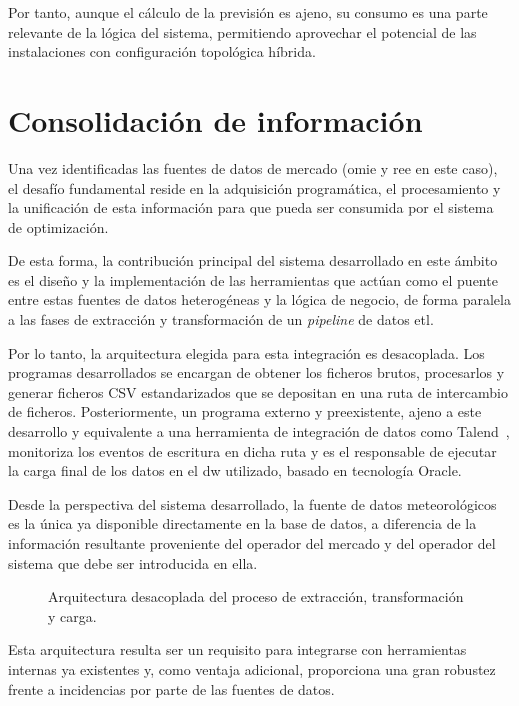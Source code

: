 Por tanto, aunque el cálculo de la previsión es ajeno, su consumo es una parte relevante de la lógica del sistema, permitiendo aprovechar el potencial de las instalaciones con configuración topológica híbrida.

\section{Consolidación de información}%
\label{makereference4.4}

Una vez identificadas las fuentes de datos de mercado (\gls{omie} y \gls{ree} en este caso), el desafío fundamental reside en la adquisición programática, el procesamiento y la unificación de esta información para que pueda ser consumida por el sistema de optimización.

De esta forma, la contribución principal del sistema desarrollado en este ámbito es el diseño y la implementación de las herramientas que actúan como el puente entre estas fuentes de datos heterogéneas y la lógica de negocio, de forma paralela a las fases de extracción y transformación de un \textit{pipeline} de datos \gls{etl}.

Por lo tanto, la arquitectura elegida para esta integración es desacoplada. Los programas desarrollados se encargan de obtener los ficheros brutos, procesarlos y generar ficheros CSV estandarizados que se depositan en una ruta de intercambio de ficheros. Posteriormente, un programa externo y preexistente, ajeno a este desarrollo y equivalente a una herramienta de integración de datos como Talend~\cite{talend2025modern}, monitoriza los eventos de escritura en dicha ruta y es el responsable de ejecutar la carga final de los datos en el \gls{dw} utilizado, basado en tecnología Oracle.

Desde la perspectiva del sistema desarrollado, la fuente de datos meteorológicos es la única ya disponible directamente en la base de datos, a diferencia de la información resultante proveniente del operador del mercado y del operador del sistema que debe ser introducida en ella.

\begin{figure}
  \centering
  \caption[Arquitectura desacoplada del proceso de datos.]{Arquitectura desacoplada del proceso de extracción, transformación y carga.}%
  \label{fig:arquitectura-mercado}
\end{figure}

Esta arquitectura resulta ser un requisito para integrarse con herramientas internas ya existentes y, como ventaja adicional, proporciona una gran robustez frente a incidencias por parte de las fuentes de datos.

